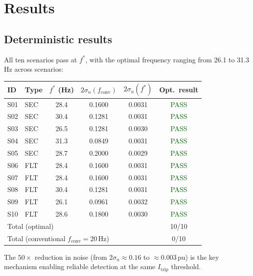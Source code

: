 \documentclass[11pt,a4paper]{article}
\newcommand{\Itrip}{I_{\mathrm{trip}}}
\newcommand{\sigman}{\sigma_n}
\newcommand{\fopt}{f^*}
\newcommand{\fconv}{f_{\mathrm{conv}}}
\begin{document}
\section{Results}
\label{sec:results}

\subsection{Deterministic results}

All ten scenarios pass at $\fopt$, with the optimal frequency ranging from
26.1 to 31.3\,Hz across scenarios:

\begin{center}
\begin{tabular}{llcccc}
  \toprule
  ID & Type & $\fopt$ (Hz) & $2\sigman(\fconv)$ & $2\sigman(\fopt)$
     & Opt.\ result \\
  \midrule
  S01 & SEC & 28.4 & 0.1600 & 0.0031 & \textcolor{darkgreen}{PASS} \\
  S02 & SEC & 30.4 & 0.1281 & 0.0031 & \textcolor{darkgreen}{PASS} \\
  S03 & SEC & 26.5 & 0.1281 & 0.0030 & \textcolor{darkgreen}{PASS} \\
  S04 & SEC & 31.3 & 0.0849 & 0.0031 & \textcolor{darkgreen}{PASS} \\
  S05 & SEC & 28.7 & 0.2000 & 0.0029 & \textcolor{darkgreen}{PASS} \\
  S06 & FLT & 28.4 & 0.1600 & 0.0031 & \textcolor{darkgreen}{PASS} \\
  S07 & FLT & 28.4 & 0.1600 & 0.0031 & \textcolor{darkgreen}{PASS} \\
  S08 & FLT & 30.4 & 0.1281 & 0.0031 & \textcolor{darkgreen}{PASS} \\
  S09 & FLT & 26.1 & 0.0961 & 0.0032 & \textcolor{darkgreen}{PASS} \\
  S10 & FLT & 28.6 & 0.1800 & 0.0030 & \textcolor{darkgreen}{PASS} \\
  \midrule
  \multicolumn{5}{l}{Total (optimal)} & 10/10 \\
  \multicolumn{5}{l}{Total (conventional $\fconv=20$\,Hz)} & 0/10 \\
  \bottomrule
\end{tabular}
\end{center}

\noindent The $50\times$ reduction in noise (from $2\sigman \approx 0.16$ to
$\approx 0.003$\,pu) is the key mechanism enabling reliable detection at
the same $\Itrip$ threshold.
\end{document}

